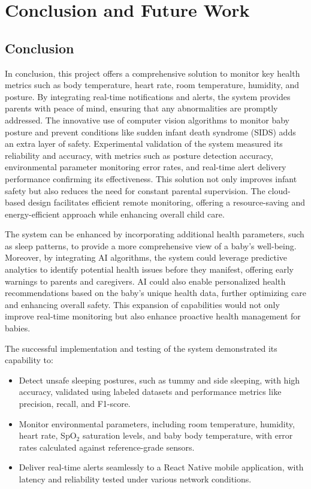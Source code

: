 \documentclass[12pt,a4paper]{report}
\begin{document}
\chapter{Conclusion and Future Work}

\section{Conclusion}
In conclusion, this project offers a comprehensive solution to monitor key health metrics such as body temperature, heart rate, room temperature, humidity, and posture. By integrating real-time notifications and alerts, the system provides parents with peace of mind, ensuring that any abnormalities are promptly addressed. The innovative use of computer vision algorithms to monitor baby posture and prevent conditions like sudden infant death syndrome (SIDS) adds an extra layer of safety. Experimental validation of the system measured its reliability and accuracy, with metrics such as posture detection accuracy, environmental parameter monitoring error rates, and real-time alert delivery performance confirming its effectiveness. This solution not only improves infant safety but also reduces the need for constant parental supervision. The cloud-based design facilitates efficient remote monitoring, offering a resource-saving and energy-efficient approach while enhancing overall child care.

The system can be enhanced by incorporating additional health parameters, such as sleep patterns, to provide a more comprehensive view of a baby's well-being. Moreover, by integrating AI algorithms, the system could leverage predictive analytics to identify potential health issues before they manifest, offering early warnings to parents and caregivers. AI could also enable personalized health recommendations based on the baby's unique health data, further optimizing care and enhancing overall safety. This expansion of capabilities would not only improve real-time monitoring but also enhance proactive health management for babies.

The successful implementation and testing of the system demonstrated its capability to:
\begin{itemize}
    \item Detect unsafe sleeping postures, such as tummy and side sleeping, with high accuracy, validated using labeled datasets and performance metrics like precision, recall, and F1-score.
    \item Monitor environmental parameters, including room temperature, humidity, heart rate, SpO$_2$ saturation levels, and baby body temperature, with error rates calculated against reference-grade sensors.
    \item Deliver real-time alerts seamlessly to a React Native mobile application, with latency and reliability tested under various network conditions.
\end{itemize}
\end{document}
